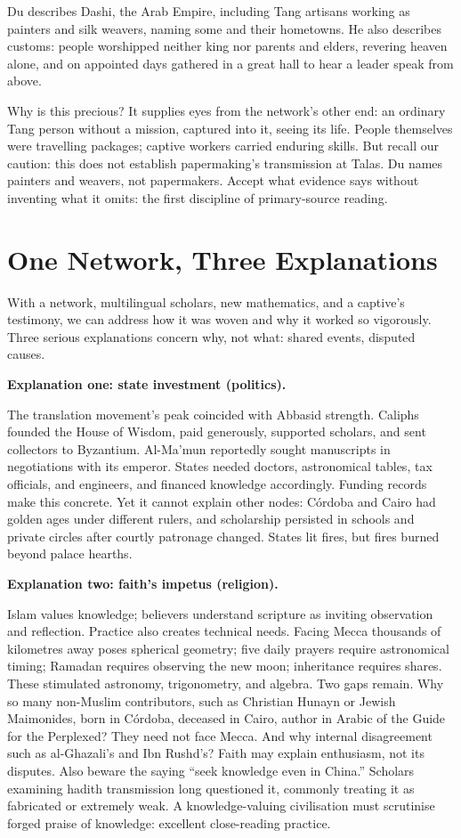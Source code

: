 Du describes Dashi, the Arab Empire, including Tang artisans working as painters and silk weavers, naming some and their hometowns. He also describes customs: people worshipped neither king nor parents and elders, revering heaven alone, and on appointed days gathered in a great hall to hear a leader speak from above.

Why is this precious? It supplies eyes from the network's other end: an ordinary Tang person without a mission, captured into it, seeing its life. People themselves were travelling packages; captive workers carried enduring skills. But recall our caution: this does not establish papermaking's transmission at Talas. Du names painters and weavers, not papermakers. Accept what evidence says without inventing what it omits: the first discipline of primary-source reading.

\section{One Network, Three Explanations}
With a network, multilingual scholars, new mathematics, and a captive's testimony, we can address how it was woven and why it worked so vigorously. Three serious explanations concern why, not what: shared events, disputed causes.

\textbf{Explanation one: state investment (politics).}

The translation movement's peak coincided with Abbasid strength. Caliphs founded the House of Wisdom, paid generously, supported scholars, and sent collectors to Byzantium. Al-Ma'mun reportedly sought manuscripts in negotiations with its emperor. States needed doctors, astronomical tables, tax officials, and engineers, and financed knowledge accordingly. Funding records make this concrete. Yet it cannot explain other nodes: Córdoba and Cairo had golden ages under different rulers, and scholarship persisted in schools and private circles after courtly patronage changed. States lit fires, but fires burned beyond palace hearths.

\textbf{Explanation two: faith's impetus (religion).}

Islam values knowledge; believers understand scripture as inviting observation and reflection. Practice also creates technical needs. Facing Mecca thousands of kilometres away poses spherical geometry; five daily prayers require astronomical timing; Ramadan requires observing the new moon; inheritance requires shares. These stimulated astronomy, trigonometry, and algebra. Two gaps remain. Why so many non-Muslim contributors, such as Christian Hunayn or Jewish Maimonides, born in Córdoba, deceased in Cairo, author in Arabic of the Guide for the Perplexed? They need not face Mecca. And why internal disagreement such as al-Ghazali's and Ibn Rushd's? Faith may explain enthusiasm, not its disputes. Also beware the saying ``seek knowledge even in China.'' Scholars examining hadith transmission long questioned it, commonly treating it as fabricated or extremely weak. A knowledge-valuing civilisation must scrutinise forged praise of knowledge: excellent close-reading practice.

